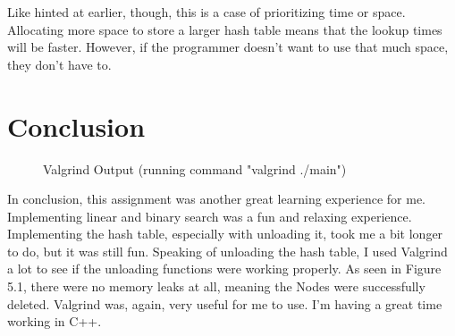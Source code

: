 \documentclass[letterpaper, 10pt]{article}
\begin{document}
\noindent
Like hinted at earlier, though, this is a case of prioritizing time or space. Allocating more space to store a larger hash table means that the lookup times will be faster. However, if the programmer doesn't want to use that much space, they don't have to.

\section{Conclusion}
\setcounter{figure}{0}

\vspace{-1em}
\begin{figure}[H] 
    \centering 
    \caption{Valgrind Output (running command "valgrind ./main")}
    \label{fig:figure5.1}
\end{figure}

\vspace{-1em}
\noindent
In conclusion, this assignment was another great learning experience for me. Implementing linear and binary search was a fun and relaxing experience. Implementing the hash table, especially with unloading it, took me a bit longer to do, but it was still fun. Speaking of unloading the hash table, I used Valgrind a lot to see if the unloading functions were working properly. As seen in Figure 5.1, there were no memory leaks at all, meaning the Nodes were successfully deleted. Valgrind was, again, very useful for me to use. I'm having a great time working in C++.
\end{document}
